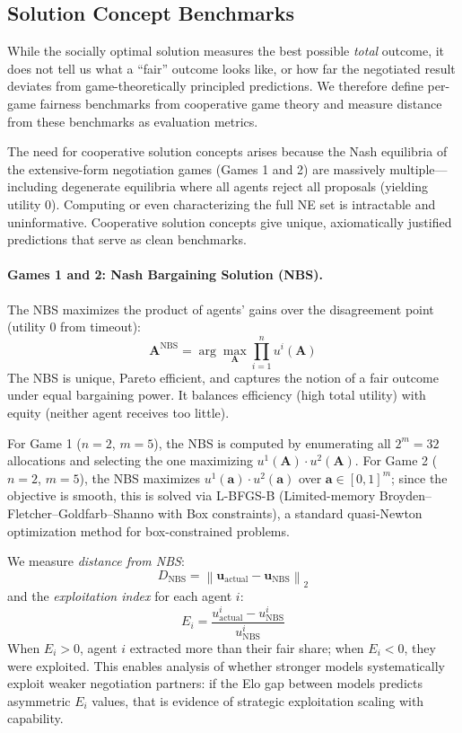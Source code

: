\subsection{Solution Concept Benchmarks}
\label{sec:solution_concepts}

While the socially optimal solution measures the best possible \emph{total} outcome, it does not tell us what a ``fair'' outcome looks like, or how far the negotiated result deviates from game-theoretically principled predictions.
We therefore define per-game fairness benchmarks from cooperative game theory and measure distance from these benchmarks as evaluation metrics.

The need for cooperative solution concepts arises because the Nash equilibria of the extensive-form negotiation games (Games 1 and 2) are massively multiple---including degenerate equilibria where all agents reject all proposals (yielding utility 0).
Computing or even characterizing the full NE set is intractable and uninformative.
Cooperative solution concepts give unique, axiomatically justified predictions that serve as clean benchmarks.

\paragraph{Games 1 and 2: Nash Bargaining Solution (NBS).}
The NBS maximizes the product of agents' gains over the disagreement point (utility 0 from timeout):
\begin{equation}
    \bm{A}^{\text{NBS}} = \arg\max_{\bm{A}} \prod_{i=1}^{n} u^i(\bm{A})
\end{equation}
The NBS is unique, Pareto efficient, and captures the notion of a fair outcome under equal bargaining power.
It balances efficiency (high total utility) with equity (neither agent receives too little).

For Game 1 ($n=2$, $m=5$), the NBS is computed by enumerating all $2^m = 32$ allocations and selecting the one maximizing $u^1(\bm{A}) \cdot u^2(\bm{A})$.
For Game 2 ($n=2$, $m=5$), the NBS maximizes $u^1(\bm{a}) \cdot u^2(\bm{a})$ over $\bm{a} \in [0,1]^m$; since the objective is smooth, this is solved via L-BFGS-B (Limited-memory Broyden--Fletcher--Goldfarb--Shanno with Box constraints), a standard quasi-Newton optimization method for box-constrained problems.

We measure \emph{distance from NBS}:
\begin{equation}
    D_{\text{NBS}} = \left\|\bm{u}_{\text{actual}} - \bm{u}_{\text{NBS}}\right\|_2
\end{equation}
and the \emph{exploitation index} for each agent $i$:
\begin{equation}
    E_i = \frac{u^i_{\text{actual}} - u^i_{\text{NBS}}}{u^i_{\text{NBS}}}
\end{equation}
When $E_i > 0$, agent $i$ extracted more than their fair share; when $E_i < 0$, they were exploited.
This enables analysis of whether stronger models systematically exploit weaker negotiation partners: if the Elo gap between models predicts asymmetric $E_i$ values, that is evidence of strategic exploitation scaling with capability.


